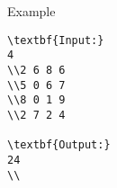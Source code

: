 Example
\begin{verbatim}
\textbf{Input:}
4
\\2 6 8 6 
\\5 0 6 7 
\\8 0 1 9 
\\2 7 2 4

\textbf{Output:}
24
\\\end{verbatim}